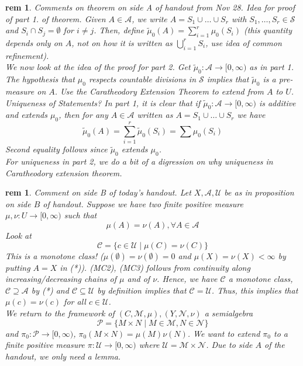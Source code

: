 \documentclass[letterpaper, 12pt]{article}
\newcommand{\fin}{\qquad \quad \hfill \framebox[1.75mm][l]{\,}}
\newcommand{\cU}{\mathcal{U}}
\newcommand{\cS}{\mathcal{S}}
\newcommand{\cC}{\mathcal{C}}
\newcommand{\cM}{\mathcal{M}}
\newcommand{\cN}{\mathcal{N}}
\newcommand{\cP}{\mathcal{P}}
\newcommand{\sA}{\mathcal{A}}
\theoremstyle{stdthm}
\theoremstyle{stddef}
\newtheorem{rem}[thm]{rem} %
\theoremstyle{stdnonum}
\theoremstyle{stdqands}
\theoremstyle{stdbold}
\begin{document}
\begin{rem}
Comments on theorem on side A of handout from Nov 28.  Idea for proof of part 1. of theorem.  Given $A \in \sA$, we write $A = S_1 \cup \dots \cup S_r$ with $S_1,\dots, S_r \in \cS$ and $S_i \cap S_j = \emptyset$ for $i \neq j$. Then, define $\tilde{\mu}_0(A) = \sum_{i=1}^r \mu_0 (S_i)$ (this quantity depends only on $A$, not on how it is written as $\bigcup_{i=1}^r S_i$, use idea of common refinement). \\

We now look at the idea of the proof for part 2. Get $\tilde{\mu}_0: \sA \to [0,\infty)$ as in part 1. The hypothesis that $\mu_0$ respects countable divisions in $\cS$ implies that $\tilde{\mu}_0$ is a pre-measure on $A$. Use the Caratheodory Extension Theorem to extend from $A$ to $U$. \\

Uniqueness of Statements? In part 1, it is clear that if $\tilde{\mu}_0: \sA \to [0,\infty)$ is additive and extends $\mu_0$, then for any $A \in \sA$ written as $A = S_1 \cup \dots \cup S_r$ we have 
\[ \tilde{\mu}_0 (A) = \sum_{i=1}^r \tilde{\mu}_0 (S_i) = \sum \mu_0 (S_i) \] 
Second equality follows since $\tilde{\mu}_0$ extends $\mu_0$.  \\

For uniqueness in part 2, we do a bit of a digression on why uniqueness in Caratheodory extension theorem. 
\end{rem}

\begin{rem}
Comment on side B of today's handout. Let $X,\sA, \cU$ be as in proposition on side $B$ of handout. Suppose we have two finite positive measure $\mu, \nu: U \to [0,\infty)$ such that 
\[ \tag{*} \mu(A) = \nu(A), \forall A \in \sA \]
Look at 
\[ \cC = \{c \in \cU \mid \mu(C) = \nu(C) \} \]
This is a monotone class!  ($\mu(\emptyset) = \nu(\emptyset) = 0$ and $\mu(X) = \nu(X) < \infty$ by putting $A = X$ in (*)). (MC2), (MC3) follows from continuity along increasing/decreasing chains of $\mu$ and  of $\nu$. Hence, we have $\cC$ a monotone class, $\cC \supseteq \sA$ by (*) and $\cC \subseteq \cU$ by definition implies that $\cC = \cU$. Thus, this implies that $\mu(c) = \nu(c)$ for all $c \in \cU$.\\

We return to the framework of $(C,\cM, \mu), (Y,\cN, \nu)$ a semialgebra
\[ \cP = \{ M \times N \mid M \in \cM, N \in \cN\}\]
and $\pi_0: \cP \to [0,\infty)$, $\pi_0(M \times N) = \mu(M) \nu(N)$. We want to extend $\pi_0$ to a finite positive measure $\pi: \cU \to [0,\infty)$ where $\cU = \cM \times \cN$. Due to side $A$ of the handout, we only need a lemma. 
\end{rem}
\end{document}
